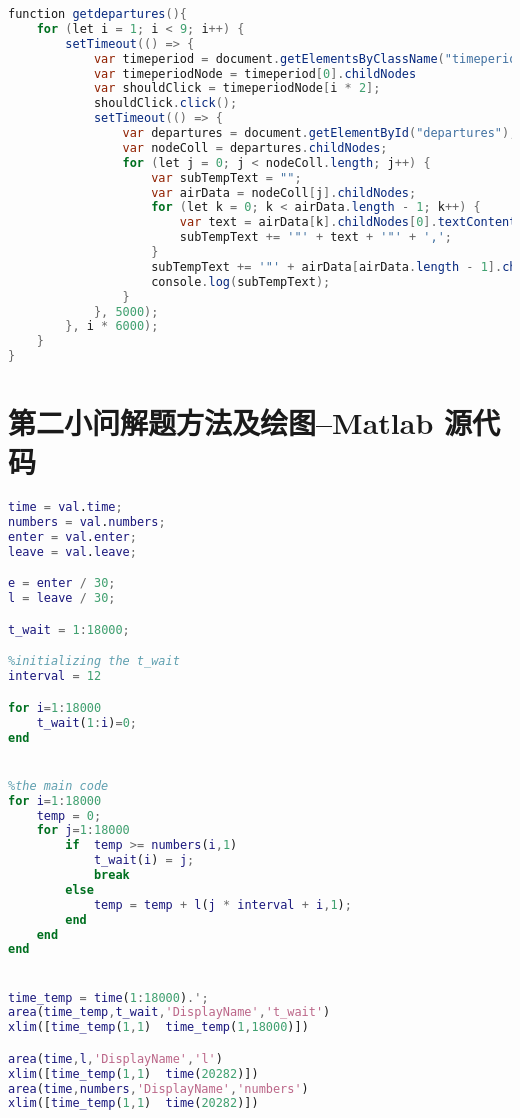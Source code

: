 \documentclass[withoutpreface,bwprint]{cumcmthesis} %
\begin{document}
\begin{appendices}
\begin{lstlisting}[language=java]
function getdepartures(){
    for (let i = 1; i < 9; i++) {
        setTimeout(() => {
            var timeperiod = document.getElementsByClassName("timeperiod");
            var timeperiodNode = timeperiod[0].childNodes
            var shouldClick = timeperiodNode[i * 2];
            shouldClick.click();
            setTimeout(() => {
                var departures = document.getElementById("departures");
                var nodeColl = departures.childNodes;
                for (let j = 0; j < nodeColl.length; j++) {
                    var subTempText = "";
                    var airData = nodeColl[j].childNodes;
                    for (let k = 0; k < airData.length - 1; k++) {
                        var text = airData[k].childNodes[0].textContent;
                        subTempText += '"' + text + '"' + ',';
                    }
                    subTempText += '"' + airData[airData.length - 1].childNodes[0].textContent + '"';
                    console.log(subTempText);
                }
            }, 5000);
        }, i * 6000);
    }    
}

\end{lstlisting}

	\section{第二小问解题方法及绘图--Matlab 源代码}
	\begin{lstlisting}[language=Matlab]
time = val.time;
numbers = val.numbers;
enter = val.enter;
leave = val.leave;

e = enter / 30;
l = leave / 30;

t_wait = 1:18000;

%initializing the t_wait
interval = 12

for i=1:18000
    t_wait(1:i)=0;
end


%the main code
for i=1:18000
    temp = 0;
    for j=1:18000
        if  temp >= numbers(i,1)
            t_wait(i) = j;
            break
        else 
            temp = temp + l(j * interval + i,1);
        end
    end
end


time_temp = time(1:18000).';
area(time_temp,t_wait,'DisplayName','t_wait')
xlim([time_temp(1,1)  time_temp(1,18000)])

area(time,l,'DisplayName','l')
xlim([time_temp(1,1)  time(20282)])
area(time,numbers,'DisplayName','numbers')
xlim([time_temp(1,1)  time(20282)])

\end{lstlisting}





\end{appendices}
\end{document}
